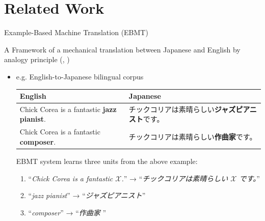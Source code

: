 \documentclass[unicode, 12pt, xdvipdfmx, aspectratio=169]{beamer}
\newcommand{\mycite}[1]{{\scriptsize\reffont({\citeauthor*{#1}, \citeyear{#1}})}}
\begin{document}
\section{Related Work}
\label{sec:org014ddbf}
\begin{frame}[label={sec:org88e5867}]{Example-Based Machine Translation (EBMT)}
\begin{block}{\small A Framework of a mechanical translation between Japanese and English by analogy principle \mycite{nagao-1984-framework}}
\begin{itemize}
\item e.g. English-to-Japanese bilingual corpus
\begin{center}
\footnotesize
\begin{tabular}{ll}
\toprule
English & Japanese\\
\midrule
Chick Corea is a fantastic \textbf{jazz pianist}. & チックコリアは素晴らしい\textbf{ジャズピアニスト}です。\\
Chick Corea is a fantastic \textbf{composer}. & チックコリアは素晴らしい\textbf{作曲家}です。\\
\bottomrule
\end{tabular}
\end{center}
\vspace{1em} EBMT system learns three units from the above example:
\begin{enumerate}
\item ``\textit{Chick Corea is a fantastic $\mathcal{X}$.}'' → ``\textit{チックコリアは素晴らしい $\mathcal{X}$ です。}''
\item ``\textit{jazz pianist}'' → ``\textit{ジャズピアニスト}''
\item ``\textit{composer}'' → ``\textit{作曲家 }''
\end{enumerate}
\end{itemize}
\end{block}
\end{frame}
\end{document}
